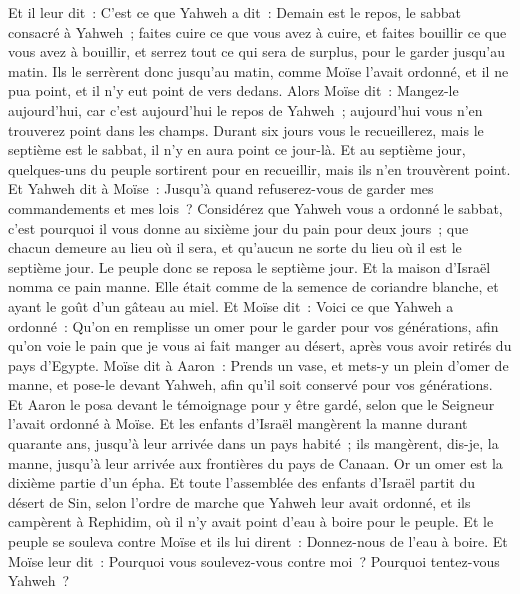 \begin{multicols}{2}
 Et il leur dit~: C'est ce que Yahweh a dit~: Demain est le repos, le sabbat consacré à Yahweh~; faites cuire ce que vous avez à cuire, et faites bouillir ce que vous avez à bouillir, et serrez tout ce qui sera de surplus, pour le garder jusqu'au matin.
Ils le serrèrent donc jusqu'au matin, comme Moïse l'avait ordonné, et il ne pua point, et il n'y eut point de vers dedans.
Alors Moïse dit~: Mangez-le aujourd'hui, car c'est aujourd'hui le repos de Yahweh~; aujourd'hui vous n'en trouverez point dans les champs.
Durant six jours vous le recueillerez, mais le septième est le sabbat, il n'y en aura point ce jour-là.
Et au septième jour, quelques-uns du peuple sortirent pour en recueillir, mais ils n'en trouvèrent point.
Et Yahweh dit à Moïse~: Jusqu'à quand refuserez-vous de garder mes commandements et mes lois~?
Considérez que Yahweh vous a ordonné le sabbat, c'est pourquoi il vous donne au sixième jour du pain pour deux jours~; que chacun demeure au lieu où il sera, et qu'aucun ne sorte du lieu où il est le septième jour.
Le peuple donc se reposa le septième jour.
Et la maison d'Israël nomma ce pain manne. Elle était comme de la semence de coriandre blanche, et ayant le goût d'un gâteau au miel.
Et Moïse dit~: Voici ce que Yahweh a ordonné~: Qu'on en remplisse un omer pour le garder pour vos générations, afin qu'on voie le pain que je vous ai fait manger au désert, après vous avoir retirés du pays d'Egypte.
Moïse dit à Aaron~: Prends un vase, et mets-y un plein d'omer de manne, et pose-le devant Yahweh, afin qu'il soit conservé pour vos générations.
Et Aaron le posa devant le témoignage pour y être gardé, selon que le Seigneur l'avait ordonné à Moïse.
Et les enfants d'Israël mangèrent la manne durant quarante ans, jusqu'à leur arrivée dans un pays habité~; ils mangèrent, dis-je, la manne, jusqu'à leur arrivée aux frontières du pays de Canaan.
Or un omer est la dixième partie d'un épha.
\VerseOne{}Et toute l'assemblée des enfants d'Israël partit du désert de Sin, selon l'ordre de marche que Yahweh leur avait ordonné, et ils campèrent à Rephidim, où il n'y avait point d'eau à boire pour le peuple.
Et le peuple se souleva contre Moïse et ils lui dirent~: Donnez-nous de l'eau à boire. Et Moïse leur dit~: Pourquoi vous soulevez-vous contre moi~? Pourquoi tentez-vous Yahweh~?

\end{multicols}
